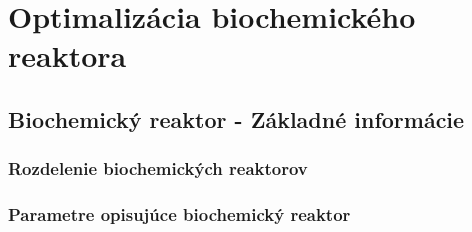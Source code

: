 \section{Optimalizácia biochemického reaktora}

\subsection{Biochemický reaktor - Základné informácie}

\subsubsection{Rozdelenie biochemických reaktorov}

\subsubsection{Parametre opisujúce biochemický reaktor}